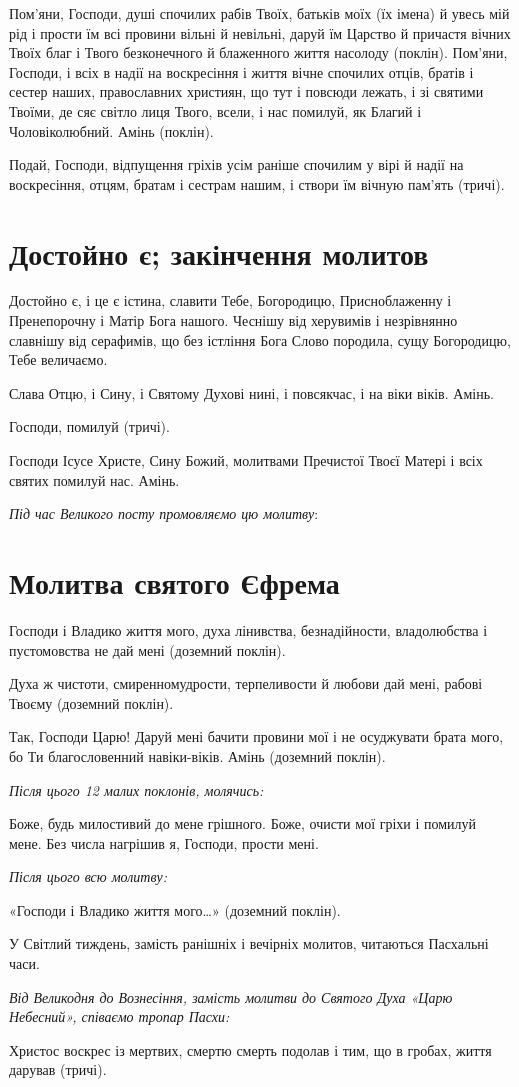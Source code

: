 \documentclass[chapters.tex]{subfiles}
\begin{document}
Пом’яни, Господи, душі спочилих рабів Твоїх, батьків моїх (їх імена) й увесь мій рід і прости їм всі провини вільні й невільні, даруй їм Царство й причастя вічних Твоїх благ і Твого безконечного й блаженного життя насолоду (поклін). Пом’яни, Господи, і всіх в надії на воскресіння і життя вічне спочилих отців, братів і сестер наших, православних християн, що тут і повсюди лежать, і зі святими Твоїми, де сяє світло лиця Твого, всели, і нас помилуй, як Благий і Чоловіколюбний. Амінь (поклін).

Подай, Господи, відпущення гріхів усім раніше спочилим у вірі й надії на воскресіння, отцям, братам і сестрам нашим, і створи їм вічную пам’ять (тричі).

\section{Достойно є; закінчення молитов}
Достойно є, і це є істина, славити Тебе, Богородицю, Присноблаженну і Пренепорочну і Матір Бога нашого. Чеснішу від херувимів і незрівнянно славнішу від серафимів, що без істління Бога Слово породила, сущу Богородицю, Тебе величаємо.

Слава Отцю, і Сину, і Святому Духові нині, і повсякчас, і на віки віків. Амінь.

Господи, помилуй (тричі).

Господи Ісусе Христе, Сину Божий, молитвами Пречистої Твоєї Матері і всіх святих помилуй нас. Амінь.

\emph{Під час Великого посту промовляємо цю молитву}:

\section{Молитва святого Єфрема}
Господи і Владико життя мого, духа лінивства, безнадійности, владолюбства і пустомовства не дай мені (доземний поклін).

Духа ж чистоти, смиренномудрости, терпеливости й любови дай мені, рабові Твоєму (доземний поклін).

Так, Господи Царю! Даруй мені бачити провини мої і не осуджувати брата мого, бо Ти благословенний навіки-віків. Амінь (доземний поклін).

\emph{Після цього 12 малих поклонів, молячись:}

Боже, будь милостивий до мене грішного. Боже, очисти мої гріхи і помилуй мене. Без числа нагрішив я, Господи, прости мені.

\emph{Після цього всю молитву:}

«Господи і Владико життя мого…» (доземний поклін).

У Світлий тиждень, замість ранішніх і вечірніх молитов, читаються Пасхальні часи.

\emph{Від Великодня до Вознесіння, замість молитви до Святого Духа «Царю Небесний», співаємо тропар Пасхи:}

Христос воскрес із мертвих, смертю смерть подолав і тим, що в гробах, життя дарував (тричі).  
\end{document}
